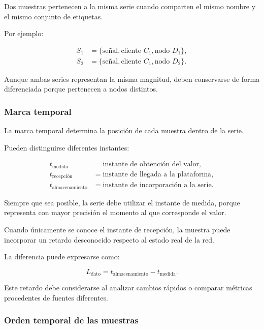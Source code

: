 Dos muestras pertenecen a la misma serie cuando comparten el mismo
nombre y el mismo conjunto de etiquetas.

Por ejemplo:

\[
\begin{aligned}
    S_1
    &=
    \{
        \text{señal},
        \text{cliente } C_1,
        \text{nodo } D_1
    \},\\
    S_2
    &=
    \{
        \text{señal},
        \text{cliente } C_1,
        \text{nodo } D_2
    \}.
\end{aligned}
\]

Aunque ambas series representan la misma magnitud, deben conservarse de
forma diferenciada porque pertenecen a nodos distintos.


\subsubsection*{Marca temporal}

La marca temporal determina la posición de cada muestra dentro de la
serie.

Pueden distinguirse diferentes instantes:

\[
\begin{aligned}
    t_{\mathrm{medida}}
    &=
    \text{instante de obtención del valor},\\
    t_{\mathrm{recepción}}
    &=
    \text{instante de llegada a la plataforma},\\
    t_{\mathrm{almacenamiento}}
    &=
    \text{instante de incorporación a la serie}.
\end{aligned}
\]

Siempre que sea posible, la serie debe utilizar el instante de medida,
porque representa con mayor precisión el momento al que corresponde el
valor.

Cuando únicamente se conoce el instante de recepción, la muestra puede
incorporar un retardo desconocido respecto al estado real de la red.

La diferencia puede expresarse como:

\[
    L_{\mathrm{dato}}
    =
    t_{\mathrm{almacenamiento}}
    -
    t_{\mathrm{medida}}.
\]

Este retardo debe considerarse al analizar cambios rápidos o comparar
métricas procedentes de fuentes diferentes.


\subsubsection*{Orden temporal de las muestras}

